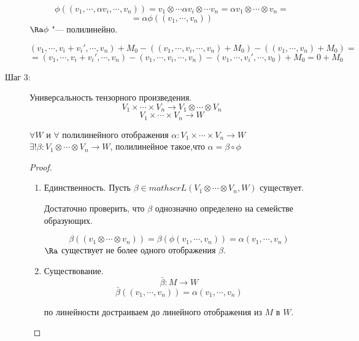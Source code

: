 \begin{description}
    $$\phi((v_1, \cdots, \alpha v_i, \cdots, v_n)) = v_1 \otimes \cdots \alpha v_i \otimes \cdots v_n = \alpha v_1 \otimes \cdots \otimes v_n = $$
    $$= \alpha \phi((v_1, \cdots, v_n))$$
    $\Ra \phi$ "--- полилинейно. 

    $$(v_1, \cdots, v_i + v_i', \cdots, v_n) + M_0 - ((v_1, \cdots, v_i, \cdots, v_n) + M_0) - ((v_1,\cdots, v_n) + M_0) =$$
    $$= (v_1, \cdots, v_i + v_i',  \cdots, v_n) - (v_1, \cdots, v_i, \cdots, v_n) -  (v_1, \cdots, v_i', \cdots, v_0) + M_0 = 0 + M_0$$
    \item[Шаг 3:] Универсальность тензорного произведения. 
    $$V_1 \times \cdots \times V_n \to  V_1 \otimes \cdots \otimes V_n$$
    $$V_1 \times \cdots \times V_n \to W $$
    \begin{theorem}
    $\forall W$ и $\forall$ полилинейного отображения $\alpha \colon V_1 \times \cdots \times V_n \to W$
    $\exists ! \beta \colon V_1 \otimes \cdots \otimes V_n \to W$, полилинейное такое,что $\alpha = \beta \circ \phi$
    \end{theorem}
    \begin{proof}
    \begin{enumerate}
    \item Единственность. 
    Пусть $\beta \in mathscr{L}(V_1 \otimes \cdots \otimes V_n, W)$  существует. 
                              
    Достаточно проверить, что $\beta$ однозначно определено на семействе образующих. 

    $$\beta((v_1\otimes \cdots \otimes v_n)) = \beta (\phi(v_1, \cdots, v_n)) = \alpha (v_1, \cdots, v_n)$$
    $\Ra$ существует не более одного отображения $\beta$.
    \item Существование. 
         $$\bar \beta \colon M \to W$$
         $$\bar \beta ((v_1, \cdots, v_n)) = \alpha(v_1, \cdots, v_n)$$

         по линейности достраиваем до линейного отображения из $M$ в $W$.
    \end{enumerate}
    \end{proof}
\end{description}
